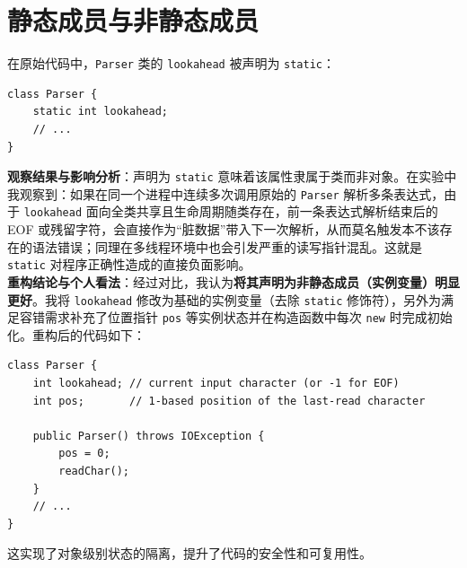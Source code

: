 \section{静态成员与非静态成员}
在原始代码中，\texttt{Parser} 类的 \texttt{lookahead} 被声明为 \texttt{static}：
\begin{lstlisting}[style=cleanjava]
class Parser {
    static int lookahead;
    // ...
}
\end{lstlisting}
\textbf{观察结果与影响分析}：声明为 \texttt{static} 意味着该属性隶属于类而非对象。在实验中我观察到：如果在同一个进程中连续多次调用原始的 \texttt{Parser} 解析多条表达式，由于 \texttt{lookahead} 面向全类共享且生命周期随类存在，前一条表达式解析结束后的 EOF 或残留字符，会直接作为“脏数据”带入下一次解析，从而莫名触发本不该存在的语法错误；同理在多线程环境中也会引发严重的读写指针混乱。这就是 \texttt{static} 对程序正确性造成的直接负面影响。\\
\textbf{重构结论与个人看法}：经过对比，我认为\textbf{将其声明为非静态成员（实例变量）明显更好}。我将 \texttt{lookahead} 修改为基础的实例变量（去除 \texttt{static} 修饰符），另外为满足容错需求补充了位置指针 \texttt{pos} 等实例状态并在构造函数中每次 \texttt{new} 时完成初始化。重构后的代码如下：
\begin{lstlisting}[style=cleanjava]
class Parser {
    int lookahead; // current input character (or -1 for EOF)
    int pos;       // 1-based position of the last-read character

    public Parser() throws IOException {
        pos = 0;
        readChar();
    }
    // ...
}
\end{lstlisting}
这实现了对象级别状态的隔离，提升了代码的安全性和可复用性。

